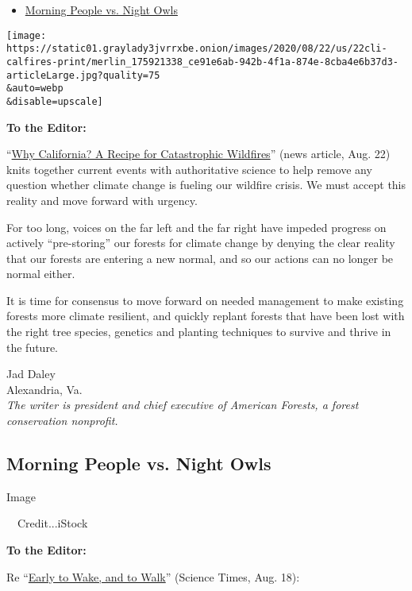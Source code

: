 \begin{itemize}
\tightlist
\item
  \protect\hyperlink{link-5c52f144}{Morning People vs. Night Owls}
\end{itemize}

\texttt{[image: https://static01.graylady3jvrrxbe.onion/images/2020/08/22/us/22cli-calfires-print/merlin\_175921338\_ce91e6ab-942b-4f1a-874e-8cba4e6b37d3-articleLarge.jpg?quality=75\\\&auto=webp\\\&disable=upscale]}

\textbf{To the Editor:}

``\href{https://www.nytimes3xbfgragh.onion/article/why-does-california-have-wildfires.html?searchResultPosition=7}{Why
California? A Recipe for Catastrophic Wildfires}'' (news article, Aug.
22) knits together current events with authoritative science to help
remove any question whether climate change is fueling our wildfire
crisis. We must accept this reality and move forward with urgency.

For too long, voices on the far left and the far right have impeded
progress on actively ``pre-storing'' our forests for climate change by
denying the clear reality that our forests are entering a new normal,
and so our actions can no longer be normal either.

It is time for consensus to move forward on needed management to make
existing forests more climate resilient, and quickly replant forests
that have been lost with the right tree species, genetics and planting
techniques to survive and thrive in the future.

Jad Daley\\
Alexandria, Va.\\
\emph{The writer is president and chief executive of American Forests, a
forest conservation nonprofit.}

\hypertarget{morning-people-vs-night-owls}{%
\subsection{Morning People vs. Night
Owls}\label{morning-people-vs-night-owls}}

Image

~~Credit...iStock

\textbf{To the Editor:}

Re
``\href{https://www.nytimes3xbfgragh.onion/2020/08/12/well/move/whether-you-are-a-night-owl-or-early-bird-may-affect-how-much-you-move.html}{Early
to Wake, and to Walk}'' (Science Times, Aug. 18):

